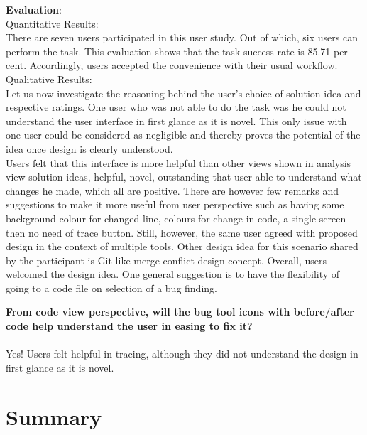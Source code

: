 \textbf{Evaluation}: \\

Quantitative Results: \\

There are seven users participated in this user study. Out of which, six users can perform the task. This evaluation shows that the task success rate is 85.71 per cent. Accordingly, users accepted the convenience with their usual workflow. \\

Qualitative Results: \\

Let us now investigate the reasoning behind the user’s choice of solution idea and respective ratings.  One user who was not able to do the task was he could not understand the user interface in first glance as it is novel. This only issue with one user could be considered as negligible and thereby proves the potential of the idea once design is clearly understood. \\

Users felt that this interface is more helpful than other views shown in analysis view solution ideas, helpful, novel, outstanding that user able to understand what changes he made, which all are positive. There are however few remarks and suggestions to make it more useful from user perspective such as having some background colour for changed line, colours for change in code, a single screen then no need of trace button. Still, however, the same user agreed with proposed design in the context of multiple tools. Other design idea for this scenario shared by the participant is Git like merge conflict design concept. Overall, users welcomed the design idea. One general suggestion is to have the flexibility of going to a code file on selection of a bug finding. \\


\begin{myboxi}{{\textbf{From code view perspective, will the bug tool icons with before/after code help understand the user in easing to fix it?}}}
\\ \\	Yes! Users felt helpful in tracing, although they did not understand the design in first glance as it is novel.
\end{myboxi}


\section{Summary}

